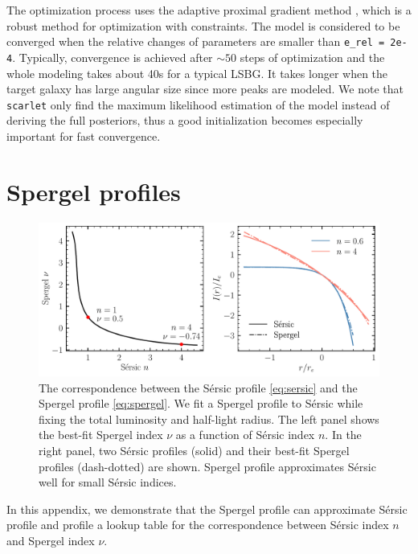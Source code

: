 \documentclass[twocolumn,astrosymb,twocolappendix]{aastex631}
\newcommand{\code}[1]{\texttt{#1}}
\newcommand{\sersic}{S\'ersic}
\begin{document}
\begin{CJK*}{UTF8}{gbsn}
The optimization process uses the adaptive proximal gradient method \citep{Melchior2019}, which is a robust method for optimization with constraints. The model is considered to be converged when the relative changes of parameters are smaller than \code{e\_rel\,=\,2e-4}. Typically, convergence is achieved after $\sim 50$ steps of optimization and the whole modeling takes about 40s for a typical LSBG. It takes longer when the target galaxy has large angular size since more peaks are modeled. We note that \code{scarlet} only find the maximum likelihood estimation of the model instead of deriving the full posteriors, thus a good initialization becomes especially important for fast convergence. 


\section{Spergel profiles}\label{ap:spergel}
\begin{figure}[htbp!]
	\vbox{ 
		\centering
		\includegraphics[width=0.75\linewidth]{spergel_sersic_calib.pdf}
	}
    \caption{The correspondence between the \sersic{} profile \eqref{eq:sersic} and the Spergel profile \eqref{eq:spergel}. We fit a Spergel profile to \sersic{} while fixing the total luminosity and half-light radius. The left panel shows the best-fit Spergel index $\nu$ as a function of \sersic{} index $n$. In the right panel, two \sersic{} profiles (solid) and their best-fit Spergel profiles (dash-dotted) are shown. Spergel profile approximates \sersic{} well for small \sersic{} indices.  
    }
    \label{fig:spgl_calib}
\end{figure}

In this appendix, we demonstrate that the Spergel profile can approximate \sersic{} profile and profile a lookup table for the correspondence between \sersic{} index $n$ and Spergel index $\nu$.


\end{CJK*}
\end{document}
